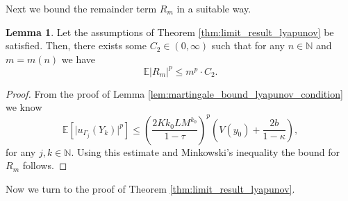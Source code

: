 \documentclass[12pt]{article}
\theoremstyle{definition}
\newtheorem{lem}[thm]{Lemma}
\newcommand{\N}{\mathbb{N}}
\newcommand{\E}{\mathbb{E}}
\begin{document}
Next we bound the remainder term $R_m$ in a suitable way.

\begin{lem}\label{lem:remainder_bound_lyapunov_condition}
	Let the assumptions of Theorem \ref{thm:limit_result_lyapunov} be satisfied. Then, there exists some $C_2 \in (0, \infty)$ such that for any $n \in \N$ and $m=m(n)$ we have
	\[
	\E	\vert R_m \vert^p \le m^p \cdot  C_2.
	\]
\end{lem}

\begin{proof}
	From the proof of Lemma \ref{lem:martingale_bound_lyapunov_condition} we know 
	\[
	\E [\vert u_{\Gamma_{j}} (Y_k)\vert^p ] 
	\le 
	\left( \frac{2Kk_0L M^{k_0} }{1- \tau}\right)^p  \left( V(y_0) + \frac{2b}{1-\kappa}  \right),
	\]
	for any $j,k \in \N$.
	Using this estimate and Minkowski's inequality the bound for $R_m$ follows.
\end{proof}

Now we turn to the proof of Theorem \ref{thm:limit_result_lyapunov}.
\end{document}
